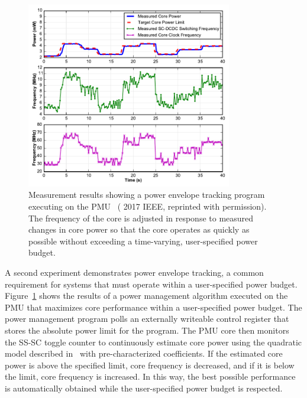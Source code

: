 \documentclass[graybox]{svmult}
\begin{document}
\begin{figure}
  \centering
  \includegraphics[width=0.8\textwidth]{6-raven4-power-tracking}
  \caption{Measurement results showing a power envelope tracking program executing on the PMU~\cite{Keller2017} ({\textcopyright} 2017 IEEE, reprinted with permission). The frequency of the core is adjusted in response to measured changes in core power so that the core operates as quickly as possible without exceeding a time-varying, user-specified power budget.}
  \label{fig:6-raven4-power-tracking}
\end{figure}

A second experiment demonstrates power envelope tracking, a common requirement for systems that must operate within a user-specified power budget.
Figure~\ref{fig:6-raven4-power-tracking} shows the results of a power management algorithm executed on the PMU that maximizes core performance within a user-specified power budget.
The power management program polls an externally writeable control register that stores the absolute power limit for the program.
The PMU core then monitors the SS-SC toggle counter to continuously estimate core power using the quadratic model described in~\cite{Cochet2016} with pre-characterized coefficients.
If the estimated core power is above the specified limit, core frequency is decreased, and if it is below the limit, core frequency is increased.
In this way, the best possible performance is automatically obtained while the user-specified power budget is respected.
\end{document}
